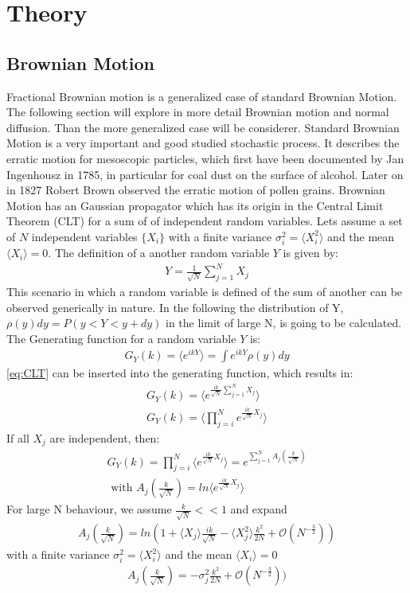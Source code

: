 \documentclass[
  a4paper,BCOR10mm,oneside,
  bibtotoc,idxtotoc,
  headsepline,footsepline,%
  fleqn,openbib
]{scrbook}
\begin{document}
\chapter{Theory}
\section{Brownian Motion}
Fractional Brownian motion is a generalized case of standard Brownian Motion. The following section  will explore in more detail Brownian motion and normal diffusion. Than the more generalized case will be considerer. \newline
Standard Brownian Motion is a very important and good studied stochastic process. It describes the erratic motion for mesoscopic particles, which  first have been documented by Jan Ingenhousz in 1785, in particular for coal dust on the surface of alcohol. Later on in 1827 Robert Brown observed the erratic motion of pollen grains.  Brownian Motion has an Gaussian propagator which has its origin in the Central Limit Theorem (CLT) for a sum of of independent random variables. Lets assume a set of $N$ independent variables $\{X_i\}$ with a finite variance $ \sigma_i^2=\langle X_{i}^2\rangle $ and the mean $\langle X_{i}\rangle = 0$. The definition of a another random variable $Y$ is given by:
 \begin{align}
  Y = \frac{1}{\sqrt{N}} \sum_{j=1}^N X_j \label{eq:CLT}
 \end{align}
This scenario in which a random variable is defined of the sum of another can be observed generically in nature. In the following the distribution of Y, $\rho(y)dy=P(y<Y<y+dy)$ in the limit of large N, is going to be calculated. 
The Generating function for a random variable $Y$ is: 
\begin{align}
 G_Y(k)=\langle e^{ikY}\rangle = \int e^{ikY} \rho(y)dy
\end{align}
\cref{eq:CLT} can be inserted into the generating function, which results in:
\begin{align*}
G_Y(k)=\langle e^{\frac{ik}{\sqrt{N}} \sum_{j=1}^N X_j}\rangle \\
G_Y(k)=\langle \prod_{j=i}^N e^{\frac{ik}{\sqrt{N}} X_j} \rangle 
\end{align*}
If all $X_j$ are independent, then:
\begin{align}
 G_Y(k)= \prod_{j=i}^N \langle e^{\frac{ik}{\sqrt{N}} X_j} \rangle =e^{\sum_{j=1}^N A_j (\frac{k}{\sqrt{N}})} \\ \nonumber \text{ with } A_j(\frac{k}{\sqrt{N}})= ln \langle e^{\frac{ik}{\sqrt{N}} X_j} \rangle 
\end{align}
For large N behaviour, we assume $\frac{k}{\sqrt{N}} << 1$ and expand
\begin{align}
 A_j(\frac{k}{\sqrt{N}}) = ln(1+ \langle X_j \rangle \frac{ik}{\sqrt{N}} - \langle X_{j}^2 \rangle \frac{k^2}{2N}+\mathcal{O}(N^{- \frac{3}{2}}))
\end{align}
 with a finite variance $ \sigma_i^2=\langle X_{i}^2\rangle $ and the mean $\langle X_{i}\rangle = 0$
\begin{align}
 A_j(\frac{k}{\sqrt{N}}) = -\sigma_j^2 \frac{k^2}{2N}+\mathcal{O}(N^{- \frac{3}{2}}))
\end{align}
\end{document}
